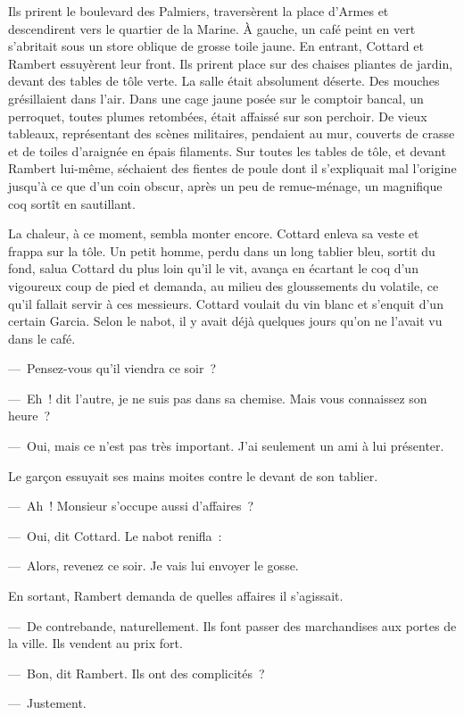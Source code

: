 \documentclass[french,twoside]{book} %
\begin{document}
Ils prirent le boulevard des Palmiers, traversèrent la place d’Armes et descendirent vers le quartier de la Marine. À gauche, un café peint en vert s’abritait sous un store oblique de grosse toile jaune. En entrant, Cottard et Rambert essuyèrent leur front. Ils prirent place sur des chaises pliantes de jardin, devant des tables de tôle verte. La salle était absolument déserte. Des mouches grésillaient dans l’air. Dans une cage jaune posée sur le comptoir bancal, un perroquet, toutes plumes retombées, était affaissé sur son perchoir. De vieux tableaux, représentant des scènes militaires, pendaient au mur, couverts de crasse et de toiles d’araignée en épais filaments. Sur toutes les tables de tôle, et devant Rambert lui-même, séchaient des fientes de poule dont il s’expliquait mal l’origine jusqu’à ce que d’un coin obscur, après un peu de remue-ménage, un magnifique coq sortît en sautillant.\par
La chaleur, à ce moment, sembla monter encore. Cottard enleva sa veste et frappa sur la tôle. Un petit homme, perdu dans un long tablier bleu, sortit du fond, salua Cottard du plus loin qu’il le vit, avança en écartant le coq d’un vigoureux coup de pied et demanda, au milieu des gloussements du volatile, ce qu’il fallait servir à ces messieurs. Cottard voulait du vin blanc et s’enquit d’un certain Garcia. Selon le nabot, il y avait déjà quelques jours qu’on ne l’avait vu dans le café.\par
— Pensez-vous qu’il viendra ce soir ?\par
— Eh ! dit l’autre, je ne suis pas dans sa chemise. Mais vous connaissez son heure ?\par
— Oui, mais ce n’est pas très important. J’ai seulement un ami à lui présenter.\par
Le garçon essuyait ses mains moites contre le devant de son tablier.\par
— Ah ! Monsieur s’occupe aussi d’affaires ?\par
— Oui, dit Cottard. Le nabot renifla :\par
— Alors, revenez ce soir. Je vais lui envoyer le gosse.\par
En sortant, Rambert demanda de quelles affaires il s’agissait.\par
— De contrebande, naturellement. Ils font passer des marchandises aux portes de la ville. Ils vendent au prix fort.\par
— Bon, dit Rambert. Ils ont des complicités ?\par
— Justement.\par
\end{document}
